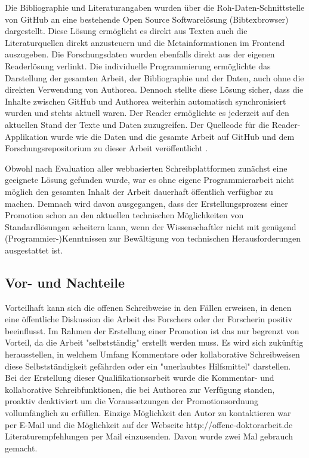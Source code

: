 Die Bibliographie und Literaturangaben wurden über die Roh-Daten-Schnittstelle von GitHub an eine bestehende Open Source Softwarelösung (Bibtexbrowser) dargestellt. Diese Lösung ermöglicht es direkt aus Texten auch die Literaturquellen direkt anzusteuern und die Metainformationen im Frontend auszugeben. Die Forschungsdaten wurden ebenfalls direkt aus der eigenen Readerlösung verlinkt. Die individuelle Programmierung ermöglichte das Darstellung der gesamten Arbeit, der Bibliographie und der Daten, auch ohne die direkten Verwendung von Authorea. Dennoch stellte diese Lösung sicher, dass die Inhalte zwischen GitHub und Authorea weiterhin automatisch synchronisiert wurden und stehts aktuell waren. Der Reader ermöglichte es jederzeit auf den aktuellen Stand der Texte und Daten zuzugreifen. Der Quellcode für die Reader-Applikation wurde wie die Daten und die gesamte Arbeit auf GitHub und dem Forschungsrepositorium zu dieser Arbeit veröffentlicht \cite{heise_2015_reader}.

Obwohl nach Evaluation aller webbasierten Schreibplattformen zunächst eine geeignete Lösung gefunden wurde, war es ohne eigene Programmierarbeit nicht möglich den gesamten Inhalt der Arbeit dauerhaft öffentlich verfügbar zu machen. Demnach wird davon ausgegangen, dass der Erstellungsprozess einer Promotion schon an den aktuellen technischen Möglichkeiten von Standardlösungen scheitern kann, wenn der Wissenschaftler nicht mit genügend (Programmier-)Kenntnissen zur Bewältigung von technischen Herausforderungen ausgestattet ist.

\subsection{Vor- und Nachteile}

Vorteilhaft kann sich die offenen Schreibweise in den Fällen erweisen, in denen eine öffentliche Diskussion die Arbeit des Forschers oder der Forscherin positiv beeinflusst. Im Rahmen der Erstellung einer Promotion ist das nur begrenzt von Vorteil, da die Arbeit "selbstständig" erstellt werden muss. Es wird sich zukünftig herausstellen, in welchem Umfang Kommentare oder kollaborative Schreibweisen diese Selbstständigkeit gefährden oder ein "unerlaubtes Hilfsmittel" \cite{promotionsordnung_leuphana_kuwi_2011} darstellen. Bei der Erstellung dieser Qualifikationsarbeit wurde die Kommentar- und kollaborative Schreibfunktionen, die bei Authorea zur Verfügung standen, proaktiv deaktiviert um die Voraussetzungen der Promotionsordnung vollumfänglich zu erfüllen. Einzige Möglichkeit den Autor zu kontaktieren war per E-Mail und die Möglichkeit auf der Webseite http://offene-doktorarbeit.de Literaturempfehlungen per Mail einzusenden. Davon wurde zwei Mal gebrauch gemacht.

